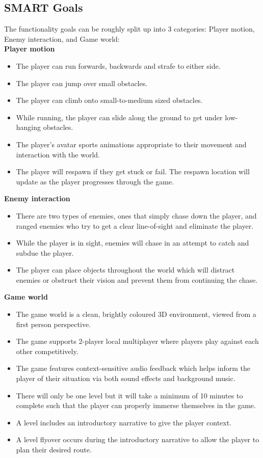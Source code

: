 \documentclass[a4paper,10pt]{article}
\begin{document}
		\subsection{SMART Goals} \label{goals}
		The functionality goals can be roughly split up into 3 categories: Player motion, Enemy interaction, and Game world:\\
		\textbf{Player motion}
		\begin{itemize}
			\item The player can run forwards, backwards and strafe to either side.
			\item The player can jump over small obstacles.
			\item The player can climb onto small-to-medium sized obstacles.
			\item While running, the player can slide along the ground to get under low-hanging obstacles.
			\item The player's avatar sports animations appropriate to their movement and interaction with the world.
			\item The player will respawn if they get stuck or fail. The respawn location will update as the player progresses through the game.
		\end{itemize}
		\textbf{Enemy interaction}
		\begin{itemize}
			\item There are two types of enemies, ones that simply chase down the player, and ranged enemies who try to get a clear line-of-sight and eliminate the player.
			\item While the player is in sight, enemies will chase in an attempt to catch and subdue the player.
			\item The player can place objects throughout the world which will distract enemies or obstruct their vision and prevent them from continuing the chase.
		\end{itemize}
		\textbf{Game world}
		\begin{itemize}
			\item The game world is a clean, brightly coloured 3D environment, viewed from a first person perspective.
			\item The game supports 2-player local multiplayer where players play against each other competitively.
			\item The game features context-sensitive audio feedback which helps inform the player of their situation via both sound effects and background music.
			\item There will only be one level but it will take a minimum of 10 minutes to complete such that the player can properly immerse themselves in the game.
			\item A level includes an introductory narrative to give the player context.
			\item A level flyover occurs during the introductory narrative to allow the player to plan their desired route.
		\end{itemize}
\end{document}

